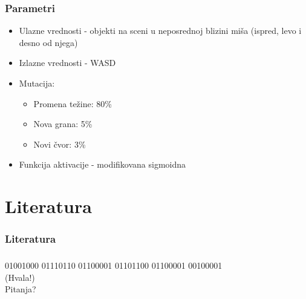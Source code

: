 \documentclass{beamer}
\begin{document}
\begin{frame} 
\frametitle{Parametri}
\begin{itemize}
\item Ulazne vrednosti - objekti na sceni u neposrednoj blizini miša (ispred, levo i desno od njega)
\item Izlazne vrednosti - WASD
\item Mutacija:
\begin{itemize}
\item Promena težine: 80\%
\item Nova grana: 5\%
\item Novi čvor: 3\%
\end{itemize}
\item Funkcija aktivacije - modifikovana sigmoidna
\end{itemize}
\end{frame}

\section{Literatura}
\begin{frame}

\nocite{NEAT}
\nocite{ai_techs}

\frametitle{Literatura}


\end{frame}

\begin{frame}
\frametitle{}
\begin{center}
{\Huge 01001000 01110110 01100001 01101100 01100001 00100001} \\
{\Huge (Hvala!)} \\ 
\bigskip
\bigskip
{\Huge Pitanja?}
\end{center}
\end{frame}
\end{document}
